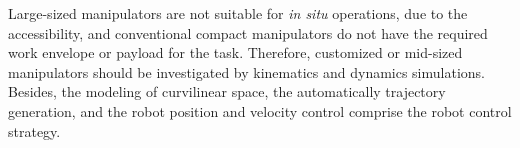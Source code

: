 Large-sized manipulators are not suitable for \textit{in situ} operations, due
to the accessibility, and conventional compact manipulators do not
have the required work envelope or payload for the task. Therefore,
customized or mid-sized manipulators should be investigated by kinematics and
dynamics simulations. Besides, the modeling of curvilinear space,
the automatically trajectory generation, and the robot position and velocity
control comprise the robot control strategy.


